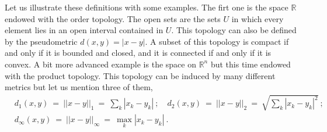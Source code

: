 \documentclass[10pt]{book}
\newcommand{\abs}[1]{\left|#1\right|}
\newcommand{\norm}[1]{\left|\left|#1\right|\right|}
\newcommand{\Rbb}{\mathbb{R}}
\newcommand{\Xsf}{\mathsf{X}}
\theoremstyle{break}
\newtheorem{lemma}{Lemma}
\begin{document}
Let us illustrate these definitions with some examples. The firt one is the space $\Rbb$ endowed with the order topology. The open sets are the sets $U$ in which every element lies in an open interval contained in $U$. This topology can also be defined by the pseudometric $d(x,y) = \abs{x-y}$. A subset of this topology is compact if and only if it is bounded and closed, and it is connected if and only if it is convex. %
A bit more advanced example is the space on $\Rbb^n$ but this time endowed with the product topology. This topology can be induced by many different metrics but let us mention three of them,
%
\begin{eqnarray*}
&d_1(x,y) \ = \ \norm{x-y}_1 \ = \ \sum_k \abs{x_k - y_k} \ ; \quad 
d_2(x,y) \ = \ \norm{x-y}_2 \ = \ \sqrt{ \sum_k \abs{x_k - y_k}^2 } \ ;& \\
&d_\infty(x,y) \ = \ \norm{x-y}_\infty \ = \ \max_k \abs{x_k - y_k} \ .&
\end{eqnarray*}




\bigskip






%
%
%
%
%
%
%
%
%
%
\end{document}
